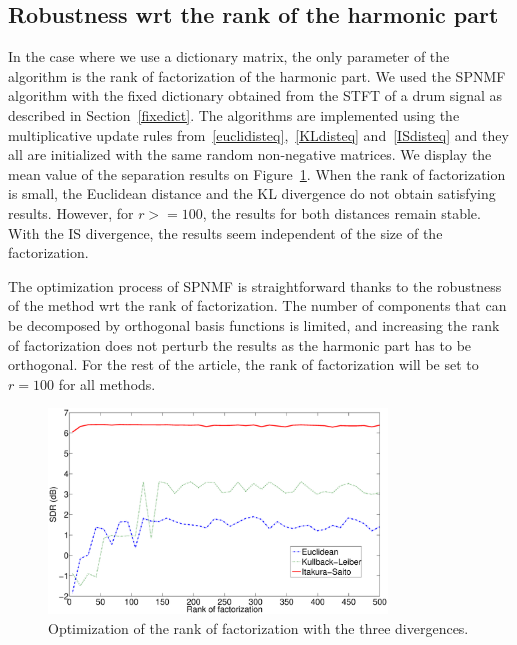 \subsection{Robustness wrt the rank of the harmonic part}
\label{setup:rank}

In the case where we use a dictionary matrix, the only parameter of the algorithm is the rank of factorization of the harmonic part. We used the SPNMF algorithm with the fixed dictionary obtained from the STFT of a drum signal as described in Section~\ref{fixedict}. The algorithms are implemented using the multiplicative update rules from~\ref{euclidisteq},~\ref{KLdisteq} and~\ref{ISdisteq} and they all are  initialized with the same random non-negative matrices. 
We display the mean value of the separation results on Figure~\ref{RankOfFact}. When the rank of factorization is small, the Euclidean distance and the KL divergence do not obtain satisfying results. However, for $r>=100$, the results for both distances remain stable. With the IS divergence, the results seem independent of the size of the factorization.

The optimization process of SPNMF is straightforward thanks to the robustness of the method wrt the rank of factorization. The number of components that can be decomposed by orthogonal basis functions is limited, and increasing the rank of factorization does not perturb the results as the harmonic part has to be orthogonal. For the rest of the article, the rank of factorization will be set to $r=100$ for all methods.



\begin{figure}[htb]

  \centering 
  \includegraphics[width=9cm]{fig/RankOfFact.eps}
  \caption{\label{RankOfFact} Optimization of the rank of factorization with the three divergences.}
  
\end{figure}




